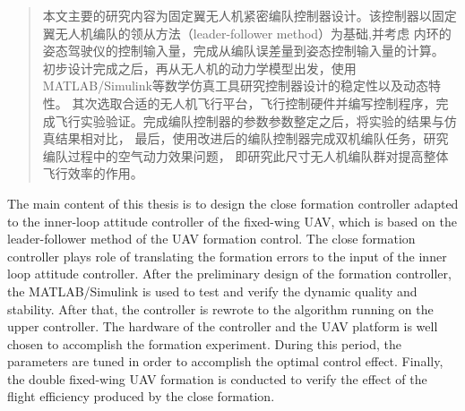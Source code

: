 
\begin{abstract}

本文主要的研究内容为固定翼无人机紧密编队控制器设计。该控制器以固定翼无人机编队的领从方法（leader-follower method）为基础,并考虑
内环的姿态驾驶仪的控制输入量，完成从编队误差量到姿态控制输入量的计算。
初步设计完成之后，再从无人机的动力学模型出发，使用MATLAB/Simulink等数学仿真工具研究控制器设计的稳定性以及动态特性。
其次选取合适的无人机飞行平台，飞行控制硬件并编写控制程序，完成飞行实验验证。完成编队控制器的参数参数整定之后，将实验的结果与仿真结果相对比，
最后，使用改进后的编队控制器完成双机编队任务，研究编队过程中的空气动力效果问题，
即研究此尺寸无人机编队群对提高整体飞行效率的作用。

\end{abstract}

\begin{englishabstract}

The main content of this thesis is to design the close formation controller adapted to the inner-loop attitude controller of
the fixed-wing UAV, which is based on the leader-follower method of the UAV formation control. The close formation controller 
plays role of translating the formation errors to the input of the inner loop
attitude controller. After the preliminary design of the formation controller, the MATLAB/Simulink is used to test and verify the 
dynamic quality and stability. After that, the controller is rewrote to the algorithm running on the upper controller. The hardware
of the controller and the UAV platform is well chosen to accomplish the formation experiment. During this period, the parameters are 
tuned in order to accomplish the optimal control effect.
Finally, the double fixed-wing UAV formation is conducted to verify the effect of the flight efficiency produced by the close formation.
   

\end{englishabstract}
